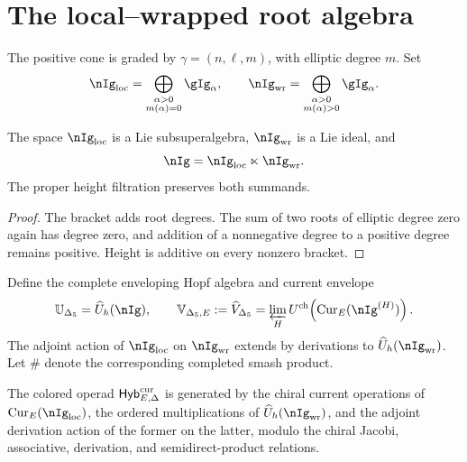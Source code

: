 \chapter{The local--wrapped root algebra}
The positive cone is graded by $\gamma=(n,\ell,m)$, with elliptic degree $m$.  Set
\[
 \nIg_{\loc}=\bigoplus_{\substack{\alpha>0\\m(\alpha)=0}}\gIg_\alpha,
 \qquad
 \nIg_{\wrap}=\bigoplus_{\substack{\alpha>0\\m(\alpha)>0}}\gIg_\alpha.
\]

\begin{proposition}
The space $\nIg_{\loc}$ is a Lie subsuperalgebra, $\nIg_{\wrap}$ is a Lie ideal, and
\[
 \nIg=\nIg_{\loc}\ltimes\nIg_{\wrap}.
\]
The proper height filtration preserves both summands.
\end{proposition}
\begin{proof}
The bracket adds root degrees.  The sum of two roots of elliptic degree zero again has degree zero, and addition of a nonnegative degree to a positive degree remains positive.  Height is additive on every nonzero bracket.
\end{proof}

Define the complete enveloping Hopf algebra and current envelope
\[
 \mathbb U_{\Delta_5}=\widehat U_h(\nIg),
 \qquad
 \mathbb V_{\Delta_5,E}:=\widehat V_{\Delta_5}=\varprojlim_HU^{\ch}\!\left(\Cur_E(\nIg^{(H)})\right).
\]
The adjoint action of $\nIg_{\loc}$ on $\nIg_{\wrap}$ extends by derivations to $\widehat U_h(\nIg_{\wrap})$.  Let $\# $ denote the corresponding completed smash product.

\begin{definition}
The colored operad $\mathsf{Hyb}^{\mathrm{cur}}_{E,\Delta}$ is generated by the chiral current operations of $\Cur_E(\nIg_{\loc})$, the ordered multiplications of $\widehat U_h(\nIg_{\wrap})$, and the adjoint derivation action of the former on the latter, modulo the chiral Jacobi, associative, derivation, and semidirect-product relations.
\end{definition}

